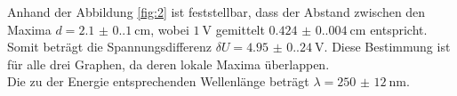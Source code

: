 Anhand der Abbildung \ref{fig:2} ist feststellbar, dass der Abstand zwischen den Maxima $d=\qty{2.1(0.1)}{\centi\meter}$, 
wobei $\qty{1}{\volt}$ gemittelt $\qty{0.424(0.004)}{\centi\meter}$ entspricht. Somit beträgt die Spannungsdifferenz 
$\delta U=\qty{4.95(0.24)}{\volt}$. Diese Bestimmung ist für alle drei Graphen, da deren lokale Maxima überlappen.\\

Die zu der Energie entsprechenden Wellenlänge beträgt $\lambda=\qty{250(12)}{\nano\meter}$.


